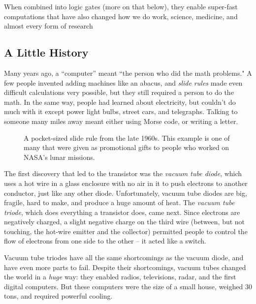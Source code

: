 \+ When combined into logic gates (more on that below), they enable super-fast computations that have also changed how we do work, science, medicine, and almost every form of research

\ei

\subsection*{A Little History}

Many years ago, a ``computer'' meant ``the person who did the math problems." A few people invented adding machines like an abacus, and \emph{slide rules} made even difficult calculations very possible, but they still required a person to do the math. In the same way, people had learned about electricity, but couldn't do much with it except power light bulbs, street cars, and telegraphs. Talking to someone many miles away meant either using Morse code, or writing a letter. 

\begin{figure}[h!]
\begin{center}
\end{center}
\caption{A pocket-sized slide rule from the late 1960s. This example is one of many that were given as promotional gifts to people who worked on NASA's lunar missions.}
\label{fig:sliderule}
\end{figure}

The first discovery that led to the transistor was the \emph{vacuum tube diode}, which uses a hot wire in a glass enclosure with no air in it to push electrons to another conductor, just like any other diode. Unfortunately, vacuum tube diodes are big, fragile, hard to make, and produce a huge amount of heat. The \emph{vacuum tube triode}, which does everything a transistor does, came next. Since electrons are negatively charged, a slight negative charge on the third wire (between, but not touching, the hot-wire emitter and the collector) permitted people to control the flow of electrons from one side to the other -- it acted like a switch. 

Vacuum tube triodes have all the same shortcomings as the vacuum diode, and have even more parts to fail. Despite their shortcomings, vacuum tubes changed the world in a \emph{huge} way: they enabled radios, televisions, radar, and the first digital computers. But these computers were the size of a small house, weighed 30 tons, and required powerful cooling.

